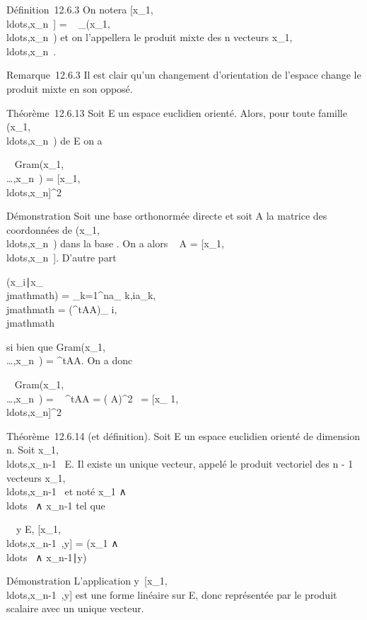 \documentclass[]{article}
\begin{document}
Définition~12.6.3 On notera
{[}x_1,\\ldots,x_n~{]}
= ~
_(x_1,\\ldots,x_n~)
et on l'appellera le produit mixte des n vecteurs
x_1,\\ldots,x_n~.

Remarque~12.6.3 Il est clair qu'un changement d'orientation de l'espace
change le produit mixte en son opposé.

Théorème~12.6.13 Soit E un espace euclidien orienté. Alors, pour toute
famille
(x_1,\\ldots,x_n~)
de E on a

~
Gram(x_1,\\\ldots,x_n~)
=
{[}x_1,\\ldots,x_n{]}^2~

Démonstration Soit  une base orthonormée directe et soit A la matrice
des coordonnées de
(x_1,\\ldots,x_n~)
dans la base . On a alors
~ A =
{[}x_1,\\ldots,x_n~{]}.
D'autre part

(x_i∣x_\\jmathmath) =
\sum _k=1^na_
k,ia_k,\\jmathmath = (^tAA)_ i,\\jmathmath

si bien que
Gram(x_1,\\\ldots,x_n~)
= ^tAA. On a donc

~
Gram(x_1,\\\ldots,x_n~)
= ~
^tAA =
( A)^2~
= {[}x_
1,\\ldots,x_n{]}^2~

Théorème~12.6.14 (et définition). Soit E un espace euclidien orienté de
dimension n. Soit
x_1,\\ldots,x_n-1~
\in E. Il existe un unique vecteur, appelé le produit vectoriel des n - 1
vecteurs
x_1,\\ldots,x_n-1~
et noté x_1
∧\\ldots~ ∧
x_n-1 tel que

\forall~~y \in E,
{[}x_1,\\ldots,x_n-1~,y{]}
= (x_1
∧\\ldots~ ∧
x_n-1∣y)

Démonstration L'application
y\mapsto~{[}x_1,\\ldots,x_n-1~,y{]}
est une forme linéaire sur E, donc représentée par le produit scalaire
avec un unique vecteur.
\end{document}
